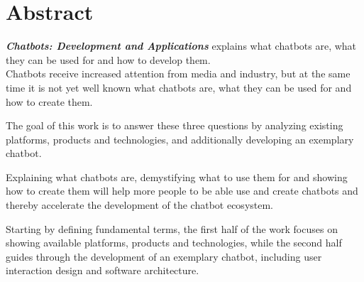 \chapter*{Abstract}

\emph{\textbf{Chatbots: Development and Applications}} explains what chatbots are, what they can be used for and how to develop them.
\\

Chatbots receive increased attention from media and industry,
but at the same time it is not yet well known what chatbots are, what they can be used for and how to create them.

The goal of this work is to answer these three questions by analyzing existing platforms, products and technologies,
and additionally developing an exemplary chatbot.

Explaining what chatbots are, demystifying what to use them for and showing how to create them
will help more people to be able use and create chatbots and thereby accelerate the development of the chatbot ecosystem.

Starting by defining fundamental terms,
the first half of the work focuses on showing available platforms, products and technologies,
while the second half guides through the development of an exemplary chatbot, including user interaction design and software architecture.
